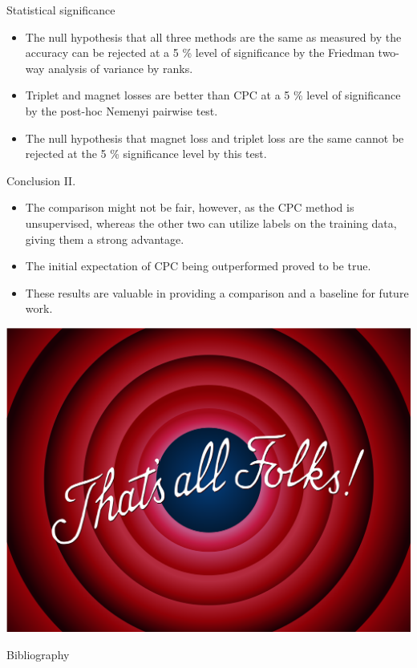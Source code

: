 \documentclass[10pt]{beamer}
\begin{document}
\begin{frame}{Statistical significance}
	\begin{itemize}
		\item The null hypothesis that all three methods are the same as measured by the accuracy can be rejected at a 5 \% level of significance by the Friedman two-way analysis of variance by ranks.
		\item Triplet and magnet losses are better than CPC at a 5 \% level of significance by the post-hoc Nemenyi pairwise test.
		\item The null hypothesis that magnet loss and triplet loss are the same cannot be rejected at the 5 \% significance level by this test.
	\end{itemize}
\end{frame}

\begin{frame}{Conclusion II.}
	\begin{itemize}
		\item The comparison might not be fair, however, as the CPC method is unsupervised, whereas the other two can utilize labels on the training data, giving them a strong advantage.
		\item The initial expectation of CPC being outperformed proved to be true.
		\item These results are valuable in providing a comparison and a baseline for future work.
	\end{itemize}
\end{frame}

\begin{frame}
	\centering
	\includegraphics[width=0.75\pagewidth]{images/thats_all.png}
\end{frame}

\begin{frame}[allowframebreaks]{Bibliography}
	\printbibliography
\end{frame}
\end{document}
